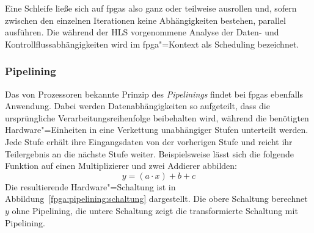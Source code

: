 Eine Schleife ließe sich auf \gls{fpga}s also ganz oder teilweise ausrollen und,
sofern zwischen den einzelnen Iterationen keine Abhängigkeiten bestehen,
parallel ausführen. Die während der HLS vorgenommene Analyse der Daten- und
Kontrollflussabhängigkeiten wird im \gls{fpga}"=Kontext als Scheduling
bezeichnet. \cite[vgl.][19]{hlsintro2019}

\subsubsection{Pipelining}

Das von Prozessoren bekannte Prinzip des \textit{Pipelinings} findet bei
\gls{fpga}s ebenfalls Anwendung. Dabei werden Datenabhängigkeiten so aufgeteilt,
dass die ursprüngliche Verarbeitungsreihenfolge beibehalten wird, während die
benötigten Hardware"=Einheiten in eine Verkettung unabhängiger Stufen unterteilt
werden. Jede Stufe erhält ihre Eingangsdaten von der vorherigen Stufe und reicht
ihr Teilergebnis an die nächste Stufe weiter. Beispielsweise lässt sich die
folgende Funktion auf einen Multiplizierer und zwei Addierer abbilden:
\[
    y = (a \cdot x) + b + c
\]
Die resultierende Hardware"=Schaltung ist in
Abbildung~\ref{fpga:pipelining:schaltung} dargestellt. Die obere Schaltung
berechnet $y$ ohne Pipelining, die untere Schaltung zeigt die transformierte
Schaltung mit Pipelining.
